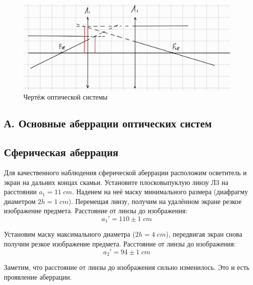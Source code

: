\documentclass{article}
\begin{document}
\begin{figure}[H]
  \centering
  \includegraphics[width=\textwidth]{draw.jpeg}
  \caption{Чертёж оптической системы}\label{fig:draw}
\end{figure}

\subsection*{А. Основные аберрации оптических систем}
\subsection{Сферическая аберрация}
Для качественного наблюдения сферической аберрации расположим осветитель и экран на дальних концах
скамьи. Установите плосковыпуклую линзу Л3 на расстоянии \(a_1 = 11\;cm\). Наденем на неё маску
минимального размера (диафрагму диаметром \(2h = 1\;cm\)). Перемещая линзу, получим на удалённом
экране резкое изображение предмета. Расстояние от линзы до изображения:
\[ a_1' = 110 \pm 1\; cm \]

Установим маску максимального диаметра (\(2h = 4\;cm\)), передвигая экран снова получим резкое
изображение предмета. Расстояние от линзы до изображения:
\[ a_2' = 94 \pm 1\; cm\]

Заметим, что расстояние от линзы до изображения сильно изменилось. Это и есть проявление аберрации.
\end{document}
